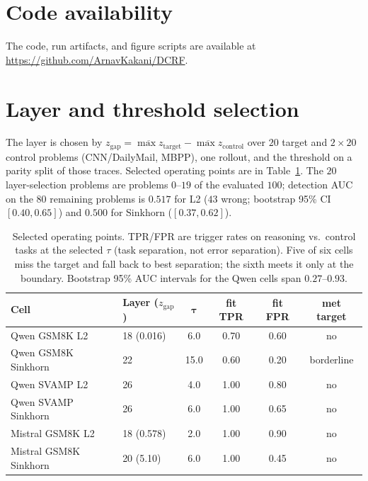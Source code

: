 \documentclass{article}
\begin{document}
\appendix
\section{Code availability}
\label{app:code}
The code, run artifacts, and figure scripts are available at
\url{https://github.com/ArnavKakani/DCRF}.

\section{Layer and threshold selection}
\label{app:calib}
The layer is chosen by $z_{\text{gap}} = \overline{\max z}_{\text{target}} -
\overline{\max z}_{\text{control}}$ over $20$ target and $2\times20$ control problems
(CNN/DailyMail, MBPP), one rollout, and the threshold on a parity split of those traces.
Selected operating points are in Table~\ref{tab:calib}. The $20$ layer-selection problems are problems $0$--$19$ of the evaluated $100$; detection AUC on the $80$ remaining problems is $0.517$ for L2 ($43$ wrong; bootstrap 95\% CI $[0.40,0.65]$) and $0.500$ for Sinkhorn ($[0.37,0.62]$).

\begin{table}[h]
\centering\small
\caption{Selected operating points. TPR/FPR are trigger rates on reasoning vs.\ control
tasks at the selected $\tau$ (task separation, not error separation). Five of six cells miss the target and fall back to best separation; the sixth meets it only at the boundary. Bootstrap 95\% AUC intervals for the Qwen cells span $0.27$--$0.93$.}
\label{tab:calib}
\begin{tabular}{llcccc}
\toprule
\bf Cell & \bf Layer ($z_{\text{gap}}$) & $\boldsymbol\tau$ & \bf fit TPR & \bf fit FPR & \bf met target \\
\midrule
Qwen GSM8K L2 & 18 (0.016) & 6.0 & 0.70 & 0.60 & no \\
Qwen GSM8K Sinkhorn & 22 & 15.0 & 0.60 & 0.20 & borderline \\
Qwen SVAMP L2 & 26 & 4.0 & 1.00 & 0.80 & no \\
Qwen SVAMP Sinkhorn & 26 & 6.0 & 1.00 & 0.65 & no \\
Mistral GSM8K L2 & 18 (0.578) & 2.0 & 1.00 & 0.90 & no \\
Mistral GSM8K Sinkhorn & 20 (5.10) & 6.0 & 1.00 & 0.45 & no \\
\bottomrule
\end{tabular}
\end{table}
\end{document}
